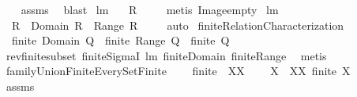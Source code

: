 \begin{isabellebody}
%
\isadelimproof
\ \ %
\endisadelimproof
%
\isatagproof
{}\isamarkupfalse%
\ assms\ \isamarkupfalse%
\ blast%
\endisatagproof
{\isafoldproof}%
%
\isadelimproof
\isanewline
%
\endisadelimproof
\isanewline
{}\isamarkupfalse%
\ lm{}{}{}{\isacharcolon}\ \isanewline
\ \ {\isachardoublequoteopen}R{\isacharbackquote}{\isacharbackquote}{\isacharbraceleft}{\isacharbraceright}{\isacharequal}{\isacharbraceleft}{\isacharbraceright}{\isachardoublequoteclose}\ \isanewline
%
\isadelimproof
\ \ %
\endisadelimproof
%
\isatagproof
{}\isamarkupfalse%
\ {\isacharparenleft}metis\ Image{\isacharunderscore}empty{\isacharparenright}%
\endisatagproof
{\isafoldproof}%
%
\isadelimproof
\isanewline
%
\endisadelimproof
\isanewline
{}\isamarkupfalse%
\ lm{}{}{}{\isacharcolon}\ \isanewline
\ \ {\isachardoublequoteopen}R\ {\isasymsubseteq}\ {\isacharparenleft}Domain\ R{\isacharparenright}\ {\isasymtimes}\ {\isacharparenleft}Range\ R{\isacharparenright}{\isachardoublequoteclose}\ \isanewline
%
\isadelimproof
\ \ %
\endisadelimproof
%
\isatagproof
{}\isamarkupfalse%
\ auto%
\endisatagproof
{\isafoldproof}%
%
\isadelimproof
\isanewline
%
\endisadelimproof
\isanewline
{}\isamarkupfalse%
\ finiteRelationCharacterization{\isacharcolon}\ \isanewline
\ \ {\isachardoublequoteopen}{\isacharparenleft}finite\ {\isacharparenleft}Domain\ Q{\isacharparenright}\ {\isacharampersand}\ finite\ {\isacharparenleft}Range\ Q{\isacharparenright}{\isacharparenright}\ {\isacharequal}\ finite\ Q{\isachardoublequoteclose}\isanewline
%
\isadelimproof
\ \ %
\endisadelimproof
%
\isatagproof
{}\isamarkupfalse%
\ rev{\isacharunderscore}finite{\isacharunderscore}subset\ finite{\isacharunderscore}SigmaI\ lm{}{}{}\ finite{\isacharunderscore}Domain\ finite{\isacharunderscore}Range\ \isamarkupfalse%
\ metis%
\endisatagproof
{\isafoldproof}%
%
\isadelimproof
\isanewline
%
\endisadelimproof
\isanewline
{}\isamarkupfalse%
\ familyUnionFiniteEverySetFinite{\isacharcolon}\ \isanewline
\ \ \ {\isachardoublequoteopen}finite\ {\isacharparenleft}{\isasymUnion}\ XX{\isacharparenright}{\isachardoublequoteclose}\ \isanewline
\ \ \ {\isachardoublequoteopen}{\isasymforall}X\ {\isasymin}\ XX{\isachardot}\ finite\ X{\isachardoublequoteclose}\ \isanewline
%
\isadelimproof
\ \ %
\endisadelimproof
%
\isatagproof
{}\isamarkupfalse%
\ assms\ \isamarkupfalse%

\end{isabellebody}
